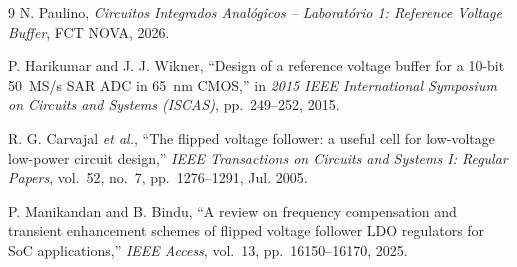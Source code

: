 \clearpage
{}
{}

\begin{thebibliography}{9}
     N. Paulino, \textit{Circuitos Integrados Analógicos -- Laboratório 1: Reference Voltage Buffer}, FCT NOVA, 2026.

     P. Harikumar and J. J. Wikner, ``Design of a reference voltage buffer for a 10-bit 50~MS/s SAR ADC in 65~nm CMOS,'' in \textit{2015 IEEE International Symposium on Circuits and Systems (ISCAS)}, pp.~249--252, 2015.

     R. G. Carvajal \textit{et al.}, ``The flipped voltage follower: a useful cell for low-voltage low-power circuit design,'' \textit{IEEE Transactions on Circuits and Systems I: Regular Papers}, vol.~52, no.~7, pp.~1276--1291, Jul. 2005.

     P. Manikandan and B. Bindu, ``A review on frequency compensation and transient enhancement schemes of flipped voltage follower LDO regulators for SoC applications,'' \textit{IEEE Access}, vol.~13, pp.~16150--16170, 2025.    

\end{thebibliography}